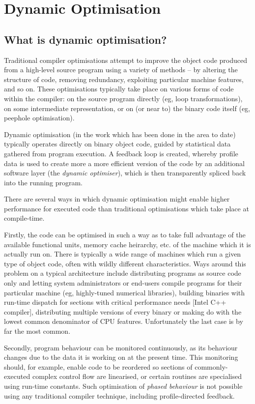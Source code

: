 \section{Dynamic Optimisation}


\subsection{What is dynamic optimisation?}

Traditional compiler optimisations attempt to improve the object code produced from a high-level source program using a variety of methods -- by altering the structure of code, removing redundancy, exploiting particular machine features, and so on. These optimisations typically take place on various forms of code within the compiler: on the source program directly (eg, loop transformations), on some intermediate representation, or on (or near to) the binary code itself (eg, peephole optimisation).

Dynamic optimisation (in the work which has been done in the area to date) typically operates directly on binary object code, guided
by statistical data gathered from program execution. A feedback loop is created, whereby profile data is used to create more a more efficient version of the code by an additional software layer (the \emph{dynamic optimiser}), which is then transparently spliced back into the running program.

There are several ways in which dynamic optimisation might enable higher performance for executed code than traditional optimisations which take place at compile-time.

Firstly, the code can be optimised in such a way as to take full advantage
of the available functional units, memory cache heirarchy, etc. of the machine
which it is actually run on. There is typically a wide range of machines which run a given type of object code, often with wildly different characteristics. Ways around this problem on a typical architecture include distributing programs as source code only and letting system administrators or end-users compile programs for their particular machine (eg, highly-tuned numerical libraries), building binaries with run-time dispatch for sections with critical performance needs [Intel C++ compiler], distributing multiple versions of every binary or making do with the lowest common denominator of CPU features. Unfortunately the last case is by far the most common.

Secondly, program behaviour can be monitored continuously, as its
behaviour changes due to the data it is working on at the present time. This monitoring should, for example, enable code to be reordered so sections of commonly-executed complex control flow are linearised, or certain routines are specialised using run-time constants. Such optimisation of \emph{phased behaviour} is not possible using any traditional compiler technique, including profile-directed feedback.

